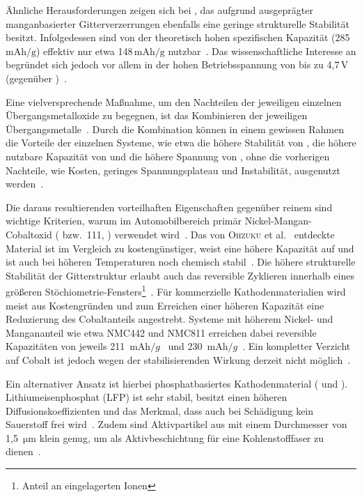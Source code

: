 Ähnliche Herausforderungen zeigen sich bei , das aufgrund ausgeprägter manganbasierter Gitterverzerrungen ebenfalls eine geringe strukturelle Stabilität besitzt. Infolgedessen sind von der theoretisch hohen spezifischen Kapazität (285\,$\si{\mA\hour\per\g}$) effektiv nur etwa 148\,$\si{\mA\hour\per\g}$ nutzbar~\cite{Chen2014}. Das wissenschaftliche Interesse an  begründet sich jedoch vor allem in der hohen Betriebsspannung von bis zu 4,7\,V (gegenüber )~\cite{Liang2020, Yu2021}.

Eine vielversprechende Maßnahme, um den Nachteilen der jeweiligen einzelnen Übergangsmetalloxide zu begegnen, ist das Kombinieren der jeweiligen Übergangsmetalle~\cite{Biasi2017}. Durch die Kombination können in einem gewissen Rahmen die Vorteile der einzelnen Systeme, wie etwa die höhere Stabilität von , die höhere nutzbare Kapazität von  und die höhere Spannung von , ohne die vorherigen Nachteile, wie Kosten, geringes Spannungsplateau und Instabilität, ausgenutzt werden~\cite{Ren2023}.

Die daraus resultierenden vorteilhaften Eigenschaften gegenüber reinem  sind wichtige Kriterien, warum im Automobilbereich primär Nickel-Mangan-Cobaltoxid ( bzw.\ 111, ) verwendet wird~\cite{Burow2016}. Das von \textsc{Ohzuku} et al.~\cite{Ohzuku2001, Yabuuchi2003} entdeckte Material ist im Vergleich zu  kostengünstiger, weist eine höhere Kapazität auf und ist auch bei höheren Temperaturen noch chemisch stabil~\cite{Kim2016,Zheng2012}. 
Die höhere strukturelle Stabilität der Gitterstruktur erlaubt auch das reversible Zyklieren innerhalb eines größeren Stöchiometrie-Fensters\footnote{Anteil an eingelagerten Ionen}~\cite{Dolotko2014,Choi2005}. 
Für kommerzielle Kathodenmaterialien wird meist aus Kostengründen und zum Erreichen einer höheren Kapazität eine Reduzierung des Cobaltanteils angestrebt. Systeme mit höherem Nickel- und Mangananteil wie etwa NMC442 und NMC811 erreichen dabei reversible Kapazitäten von jeweils 211~$\si{\milli \ampere \hour \per g}$~\cite{Ma2014} und 230~$\si{\milli \ampere \hour \per g}$~\cite{Xue2021}. Ein kompletter Verzicht auf Cobalt ist jedoch wegen der stabilisierenden Wirkung derzeit nicht möglich~\cite{Ren2023}.

Ein alternativer Ansatz ist hierbei phosphatbasiertes Kathodenmaterial ( und ). Lithiumeisenphosphat (LFP) ist sehr stabil, besitzt einen höheren Diffusionskoeffizienten und das Merkmal, dass auch bei Schädigung kein Sauerstoff frei wird~\cite{Ling2021}. Zudem sind Aktivpartikel aus  mit einem Durchmesser von 1,5~$\si{\um}$ klein genug, um als Aktivbeschichtung für eine Kohlenstofffaser zu dienen~\cite{Yuecel2023}.

